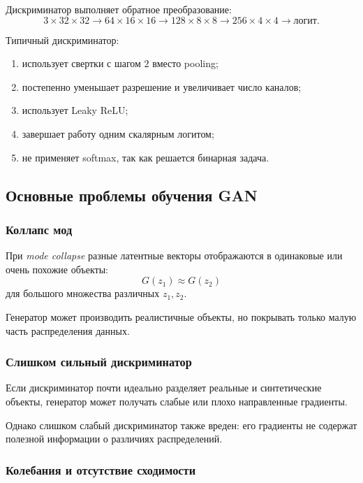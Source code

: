 \documentclass[12pt,a4paper]{article}
\numberwithin{equation}{section}
\theoremstyle{definition}
\theoremstyle{remark}
\begin{document}
Дискриминатор выполняет обратное преобразование:
\[
    3\times32\times32
    \longrightarrow
    64\times16\times16
    \longrightarrow
    128\times8\times8
    \longrightarrow
    256\times4\times4
    \longrightarrow
    \text{логит}.
\]

Типичный дискриминатор:

\begin{enumerate}
    \item использует свертки с шагом \(2\) вместо pooling;
    \item постепенно уменьшает разрешение и увеличивает число каналов;
    \item использует Leaky ReLU;
    \item завершает работу одним скалярным логитом;
    \item не применяет softmax, так как решается бинарная задача.
\end{enumerate}

\subsection{Основные проблемы обучения GAN}

\subsubsection{Коллапс мод}

При \emph{mode collapse} разные латентные векторы отображаются в
одинаковые или очень похожие объекты:
\[
    G(z_1)\approx G(z_2)
\]
для большого множества различных \(z_1,z_2\).

Генератор может производить реалистичные объекты, но покрывать только
малую часть распределения данных.

\subsubsection{Слишком сильный дискриминатор}

Если дискриминатор почти идеально разделяет реальные и синтетические
объекты, генератор может получать слабые или плохо направленные
градиенты.

Однако слишком слабый дискриминатор также вреден: его градиенты не
содержат полезной информации о различиях распределений.

\subsubsection{Колебания и отсутствие сходимости}
\end{document}

